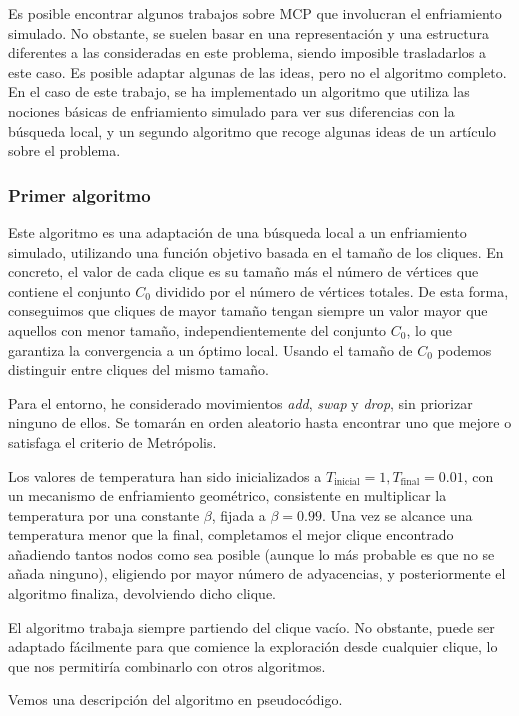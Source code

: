 Es posible encontrar algunos trabajos sobre MCP que involucran el enfriamiento simulado. No obstante,
se suelen basar en una representación y una estructura diferentes a las consideradas en este problema,
siendo imposible trasladarlos a este caso. Es posible adaptar algunas de las ideas, pero no el algoritmo
completo. En el caso de este trabajo, se ha implementado un algoritmo que utiliza las nociones
básicas de enfriamiento simulado para ver sus diferencias con la búsqueda local, y un segundo algoritmo
que recoge algunas ideas de un artículo sobre el problema.

\subsubsection{Primer algoritmo}

Este algoritmo es una adaptación de una búsqueda local a un enfriamiento simulado, utilizando una función
objetivo basada en el tamaño de los cliques. En concreto, el valor de cada clique es su tamaño más el número
de vértices que contiene el conjunto $C_0$ dividido por el número de vértices totales. De esta forma,
conseguimos que cliques de mayor tamaño tengan siempre un valor mayor que aquellos con menor tamaño, independientemente
del conjunto $C_0$, lo que garantiza la convergencia a un óptimo local. Usando el tamaño de $C_0$ podemos
distinguir entre cliques del mismo tamaño.

Para el entorno, he considerado movimientos \textit{add}, \textit{swap} y \textit{drop}, sin priorizar
ninguno de ellos. Se tomarán en orden aleatorio hasta encontrar uno que mejore o satisfaga el criterio de
Metrópolis.

Los valores de temperatura han sido inicializados a $T_{\text{inicial}} = 1, T_{\text{final}} = 0.01$, con un
mecanismo de enfriamiento geométrico, consistente en multiplicar la temperatura por una constante $\beta$, fijada a
$\beta = 0.99$. Una vez se alcance una temperatura menor que la final, completamos el mejor clique encontrado añadiendo
tantos nodos como sea posible (aunque lo más probable es que no se añada ninguno), eligiendo por mayor número de
adyacencias, y posteriormente el algoritmo finaliza, devolviendo dicho clique.

El algoritmo trabaja siempre partiendo del clique vacío. No obstante, puede ser adaptado fácilmente para que
comience la exploración desde cualquier clique, lo que nos permitiría combinarlo con otros algoritmos.

Vemos una descripción del algoritmo en pseudocódigo.

